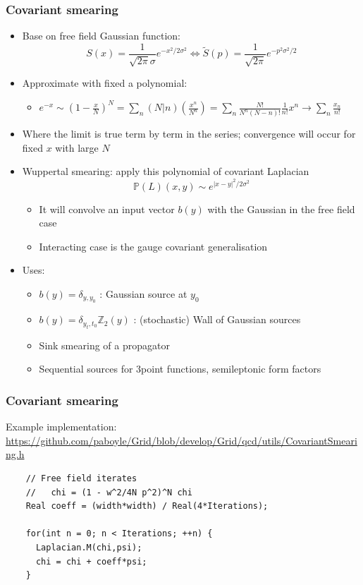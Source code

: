 \documentclass[pdf,ps,8pt]{beamer}
\newcommand{\link}[1]{\href{#1}{ {\color{blue} #1} }}
\begin{document}
  \begin{frame}[fragile]\small\frametitle{ Covariant smearing}

    \begin{itemize}
    \item Base on free field Gaussian function:
      $$S(x) = \frac{1}{\sqrt{2\pi}\sigma} e^{-x^2/ 2\sigma^2} \Leftrightarrow \tilde S(p) = \frac{1}{\sqrt{2\pi}} e^{-p^2 \sigma^2/2}$$
    \item Approximate with fixed a polynomial:
    \begin{itemize}
       \item $e^{-x} \sim (1-\frac{x}{N})^N = \sum_n (N| n) (\frac{x^n}{N^n}) = \sum_n \frac{N!}{ N^n (N-n)!}  \frac{1}{n!} x^n \to \sum_n \frac{x_n}{n!}$
    \end{itemize}
    \item Where the limit is true term by term in the series; convergence will occur for fixed $x$ with large $N$
    \item Wuppertal smearing: apply this polynomial of covariant Laplacian $$\mathbb{P}(L) (x,y) \sim e^{|x-y|^2/2\sigma^2}$$
      \begin{itemize}
    \item It will convolve an input vector $b(y)$ with the Gaussian in the free field case
    \item Interacting case is the gauge covariant generalisation
     \end{itemize}
    \item Uses:
      \begin{itemize}
      \item $b(y) = \delta_{y,y_0}$  : Gaussian source at $y_0$
    \item $b(y) = \delta_{y_t,t_0} \mathbb{Z}_2(y)$  : (stochastic) Wall of Gaussian sources
    \item Sink smearing of a propagator
    \item Sequential sources for 3point functions, semileptonic form factors 
    \end{itemize}
    \end{itemize}
  \end{frame}

  \begin{frame}[fragile]\small\frametitle{ Covariant smearing}
Example implementation: \link{https://github.com/paboyle/Grid/blob/develop/Grid/qcd/utils/CovariantSmearing.h}
\begin{verbatim}
    // Free field iterates 
    //   chi = (1 - w^2/4N p^2)^N chi
    Real coeff = (width*width) / Real(4*Iterations);
  
    for(int n = 0; n < Iterations; ++n) {
      Laplacian.M(chi,psi);
      chi = chi + coeff*psi;
    }
\end{verbatim}

  \end{frame}
\end{document}
